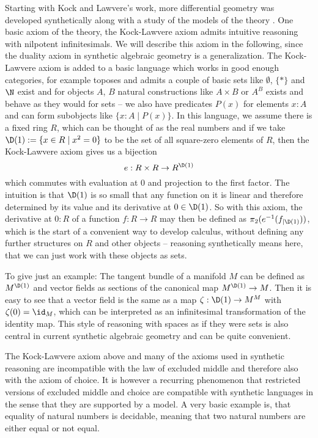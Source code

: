Starting with Kock and Lawvere's work, more differential geometry was developed synthetically \cite{kock-sdg} along with a study of the models of the theory \cite{moerdijk-reyes}.
One basic axiom of the theory, the Kock-Lawvere axiom admits intuitive reasoning with nilpotent infinitesimals.
We will describe this axiom in the following, since the duality axiom in synthetic algebraic geometry is a generalization.
The Kock-Lawvere axiom is added to a basic language which works in good enough categories, for example toposes and admits a couple of basic sets like $\emptyset$, $\{\ast\}$ and $\N$ exist and for objects $A$, $B$ natural constructions like $A\times B$ or $A^B$ exists and behave as they would for sets -- we also have predicates $P(x)$ for elements $x:A$ and can form subobjects like $\{x:A\mid P(x)\}$.
In this language, we assume there is a fixed ring $R$, which can be thought of as the real numbers and if we take $\D(1):=\{x\in R\mid x^2=0\}$ to be the set of all square-zero elements of $R$, then the Kock-Lawvere axiom gives us a bijection
\[ e : R \times R  \to R^{\D(1)} \]
which commutes with evaluation at 0 and projection to the first factor.
The intuition is that $\D(1)$ is so small that any function on it is linear and therefore determined by its value and its derivative at $0\in\D(1)$.
So with this axiom, the derivative at $0:R$ of a function $f : R \to R$ may then be defined as $\pi_2(e^{-1}(f_{\vert \D(1)}))$, which is the start of a convenient way to develop calculus, without defining any further structures on $R$ and other objects -- reasoning synthetically means here, that we can just work with these objects as sets.

To give just an example: The tangent bundle of a manifold $M$ can be defined as $M^{\D(1)}$ and vector fields as sections of the canonical map $M^{\D(1)}\to M$. Then it is easy to see that a vector field is the same as a map $\zeta:\D(1)\to M^M$ with $\zeta(0)=\id_M$, which can be interpreted as an infinitesimal transformation of the identity map. This style of reasoning with spaces as if they were sets is also central in current synthetic algebraic geometry and can be quite convenient. 

The Kock-Lawvere axiom above and many of the axioms used in synthetic reasoning are incompatible with the law of excluded middle and therefore also with the axiom of choice. It is however a recurring phenomenon that restricted versions of excluded middle and choice are compatible with synthetic languages in the sense that they are supported by a model. A very basic example is, that equality of natural numbers is decidable, meaning that two natural numbers are either equal or not equal. 

